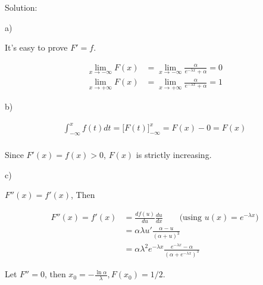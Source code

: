 \documentclass[letterpaper, 11pt]{article}
\newcommand{\1}{\mathds{1}}	%
\theoremstyle{definition}
\begin{document}
  Solution:

  a)

  It's easy to prove $F' = f$.

  \begin{align*}
    \lim_{x \to -\infty} F(x) & = \lim_{x \to -\infty} \frac{\alpha}{e ^{- \lambda x} + \alpha} = 0 \\
    \lim_{x \to +\infty} F(x) & =\lim_{x \to +\infty} \frac{\alpha}{e ^{- \lambda x} + \alpha} = 1
  \end{align*}

  b)

  \begin{align*}
    \int_{-\infty }^{x} f(t) dt = \Big[ F(t) \Big]_{- \infty }^{x} = F(x) -0 = F(x) \\
  \end{align*}

  Since $  F'(x) = f(x) >0$, $F(x)$ is strictly increasing.

  c)

$F''(x) = f'(x)$, Then

  \begin{align*}
    F''(x) = f'(x) & = \frac{df(u)}{du} \frac{du}{dx} \qquad \text{(using $u(x) = e ^{-\lambda x}$)}                          \\
                   & = \alpha \lambda u' \frac{\alpha - u}{(\alpha + u)^{3}}                                                  \\
                   & = \alpha \lambda ^{2} e ^{- \lambda x} \frac{e ^{- \lambda x} - \alpha}{(\alpha + e ^{- \lambda x})^{3}}
  \end{align*}

  Let $F'' = 0$, then $x_{0} = -\frac{\ln \alpha}{\lambda}, F(x_{0}) = 1/2$.


\end{document}
